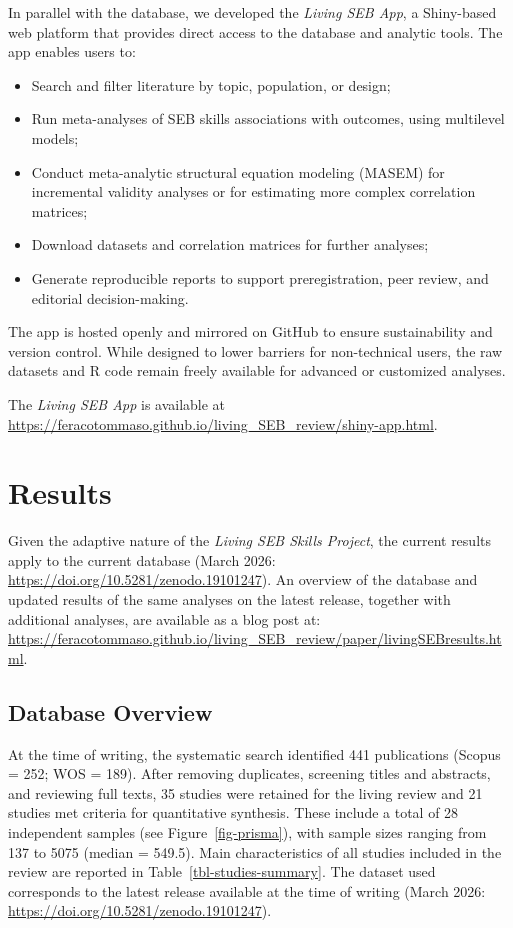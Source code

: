 \documentclass[
  man,
  longtable,
  nolmodern,
  notxfonts,
  notimes,
  colorlinks=true,linkcolor=blue,citecolor=blue,urlcolor=blue]{apa7}
\begin{document}
In parallel with the database, we developed the \emph{Living SEB App}, a
Shiny-based web platform that provides direct access to the database and
analytic tools. The app enables users to:

\begin{itemize}
\item
  Search and filter literature by topic, population, or design;
\item
  Run meta-analyses of SEB skills associations with outcomes, using
  multilevel models;
\item
  Conduct meta-analytic structural equation modeling (MASEM) for
  incremental validity analyses or for estimating more complex
  correlation matrices;
\item
  Download datasets and correlation matrices for further analyses;
\item
  Generate reproducible reports to support preregistration, peer review,
  and editorial decision-making.
\end{itemize}

The app is hosted openly and mirrored on GitHub to ensure sustainability
and version control. While designed to lower barriers for non-technical
users, the raw datasets and R code remain freely available for advanced
or customized analyses.

The \emph{Living SEB App} is available at
\url{https://feracotommaso.github.io/living_SEB_review/shiny-app.html}.

\section{Results}\label{results}

Given the adaptive nature of the \emph{Living SEB Skills Project}, the
current results apply to the current database (March 2026:
\url{https://doi.org/10.5281/zenodo.19101247}). An overview of the
database and updated results of the same analyses on the latest release,
together with additional analyses, are available as a blog post at:
\url{https://feracotommaso.github.io/living_SEB_review/paper/livingSEBresults.html}.

\subsection{Database Overview}\label{database-overview}

At the time of writing, the systematic search identified 441
publications (Scopus = 252; WOS = 189). After removing duplicates,
screening titles and abstracts, and reviewing full texts, 35 studies
were retained for the living review and 21 studies met criteria for
quantitative synthesis. These include a total of 28 independent samples
(see Figure~\ref{fig-prisma}), with sample sizes ranging from 137 to
5075 (median = 549.5). Main characteristics of all studies included in
the review are reported in Table~\ref{tbl-studies-summary}. The dataset
used corresponds to the latest release available at the time of writing
(March 2026: \url{https://doi.org/10.5281/zenodo.19101247}).
\end{document}
